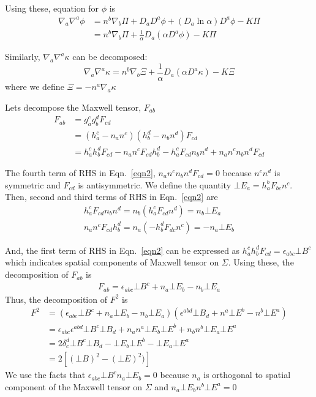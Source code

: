 \documentclass[prd]{revtex4}
\begin{document}
Using these, equation for $\phi$ is
\begin{align}
\nabla_a \nabla^a \phi &= n^b \nabla_b \Pi + D_a D^a \phi + (D_a \ln \alpha)D^a \phi - K \Pi \nonumber \\
				  &= n^b \nabla_b \Pi + \frac{1}{\alpha} D_a (\alpha D^a \phi) - K \Pi
\end{align}


Similarly, $\nabla_a \nabla^a \kappa$ can be decomposed:
\begin{equation}
\label{decompk1}
\nabla_a \nabla^a \kappa = n^b \nabla_b \Xi + \frac{1}{\alpha} D_a (\alpha D^a \kappa) - K \Xi
\end{equation}
where we define $\Xi=-n^a \nabla_a \kappa$

Let\textsc{}s decompose the Maxwell tensor, $F_{ab}$
\begin{align}
\label{eqn2}
F_{ab} &= g_a^c g_b^d F_{cd} \nonumber \\
	   &= (h_a^c - n_a n^c)(h_b^d - n_b n^d) F_{cd} \nonumber\\
	   &=h_a^c h_b^d F_{cd} - n_a n^c F_{cd} h_b^d - h_a^c F_{cd} n_b n^d +n_a n^c n_b n^d F_{cd}
\end{align}

The fourth term of RHS in Eqn.~\ref{eqn2}, $n_a n^c n_b n^d F_{cd}=0$ because $n^c n^d$ is symmetric and $F_{cd}$ is antisymmetric. We define the quantity $\bot E_a = h_a^b F_{bc} n^c$. Then, second and third terms of RHS in Eqn.~\ref{eqn2} are
\begin{align}
h_a^c F_{cd} n_b n^d = n_b (h_a^c F_{cd} n^d) = n_b \bot E_a \nonumber \\
n_a n^c F_{cd} h_b^d = n_a (-h_b^d F_{dc} n^c) = -n_a \bot E_b \nonumber
\end{align}

And, the first term of RHS in Eqn.~\ref{eqn2} can be expressed as $h_a^c h_b^d F_{cd} = \epsilon_{abc} \bot B^c$ which indicates spatial components of Maxwell tensor on $\Sigma$. Using these, the decomposition of $F_{ab}$ is
\begin{align}
F_{ab} = \epsilon_{abc} \bot B^c + n_a \bot E_b - n_b \bot E_a
\end{align}
Thus, the decomposition of $F^2$ is
\begin{align}
F^2 & = (\epsilon_{abc} \bot B^c + n_a \bot E_b - n_b \bot E_a) (\epsilon^{abd} \bot B_d + n^a \bot E^b - n^b \bot E^a)\nonumber \\
	& = \epsilon_{abc} \epsilon^{abd} \bot B^c \bot B_d + n_a n^a \bot E_b \bot E^b + n_b n^b \bot E_a \bot E^a \nonumber \\
	& = 2 \delta_c^d \bot B^c \bot B_d - \bot E_b \bot E^b - \bot E_a \bot E^a \nonumber \\
	& = 2 [ (\bot B)^2 - (\bot E)^2)]
\end{align}
We use the facts that $\epsilon_{abc} \bot B^c n_a \bot E_b = 0$ because $n_a$ is orthogonal to spatial component of the Maxwell tensor on $\Sigma$ and $n_a \bot E_b n^b \bot E^a =0$
\end{document}
